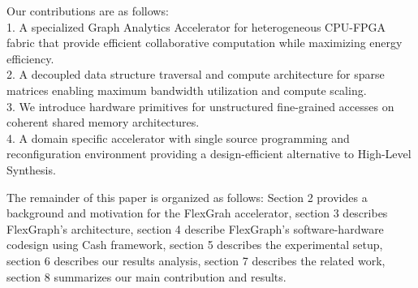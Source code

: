Our contributions are as follows:\\
1.	A specialized Graph Analytics Accelerator for heterogeneous CPU-FPGA fabric that provide efficient collaborative computation while maximizing energy efficiency.\\
2. 	A decoupled data structure traversal and compute architecture for sparse matrices enabling maximum bandwidth utilization and compute scaling.\\
3.	We introduce hardware primitives for unstructured fine-grained accesses on coherent shared memory architectures.\\
4.	A domain specific accelerator with single source programming and reconfiguration environment providing a design-efficient alternative to High-Level Synthesis.  

The remainder of this paper is organized as follows:
Section 2 provides a background and motivation for the FlexGrah accelerator, section 3 describes FlexGraph's architecture, section 4 describe FlexGraph's software-hardware codesign using Cash \cite{Cash} framework, section 5 describes the experimental setup, section 6 describes our results analysis, section 7 describes the related work, section 8 summarizes our main contribution and results.